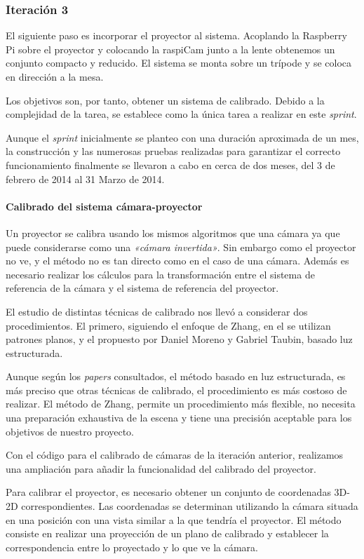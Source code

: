 \subsubsection{Iteración 3}
El siguiente paso es incorporar el proyector al sistema. Acoplando la Raspberry Pi sobre el proyector y colocando la raspiCam junto a la lente obtenemos un conjunto compacto y reducido. El sistema se monta sobre un trípode y se coloca en dirección a la mesa.

Los objetivos son, por tanto, obtener un sistema de calibrado. Debido a la complejidad de la tarea, se establece como la única tarea a realizar en este \textit{sprint}.

Aunque el \textit{sprint} inicialmente se planteo con una duración aproximada de un mes, la construcción y las numerosas pruebas realizadas para garantizar el correcto funcionamiento finalmente se llevaron a cabo en cerca de dos meses, del 3 de febrero de 2014 al 31 Marzo de 2014. 

\paragraph{Calibrado del sistema cámara-proyector}
Un proyector se calibra usando los mismos algoritmos que una cámara ya que puede considerarse como una \textit{«cámara invertida»}. Sin embargo como el proyector no ve, y el método no es tan directo como en el caso de una cámara. Además es necesario realizar los cálculos para la transformación entre el sistema de referencia de la cámara y el sistema de referencia del proyector.

El estudio de distintas técnicas de calibrado nos llevó a considerar dos procedimientos. El primero, siguiendo el enfoque de Zhang, en el se utilizan patrones planos, y el propuesto por Daniel Moreno y Gabriel Taubin, basado luz estructurada.

Aunque según los \textit{papers} consultados, el método basado en luz estructurada, es más preciso que otras técnicas de calibrado, el procedimiento es más costoso de realizar. El método de Zhang, permite un procedimiento más flexible, no necesita una preparación exhaustiva de la escena y tiene una precisión aceptable para los objetivos de nuestro proyecto.

Con el código para el calibrado de cámaras de la iteración anterior, realizamos una ampliación para añadir la funcionalidad del calibrado del proyector.

Para calibrar el proyector, es necesario obtener un conjunto de coordenadas 3D-2D correspondientes. Las coordenadas se determinan utilizando la cámara situada en una posición con una vista similar a la que tendría el proyector. El método consiste en realizar una proyección de un plano de calibrado y establecer la correspondencia entre lo proyectado y lo que ve la cámara.
 
